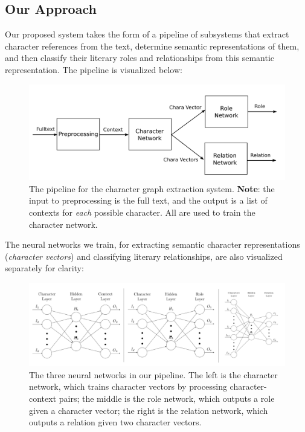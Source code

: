 \documentclass[12pt]{article}
\begin{document}
\subsection{Our Approach}
    Our proposed system takes the form of a pipeline of subsystems that extract character references from the text, determine semantic representations of them, and then classify their literary roles and relationships from this semantic representation. The pipeline is visualized below: 
    
    \begin{figure}[H]
        \centering
        \includegraphics[width=6in]{pipeline.png}
        \caption{The pipeline for the character graph extraction system. \textbf{Note}: the input to preprocessing is the full text, and the output is a list of contexts for \emph{each} possible character. All are used to train the character network.} 
    \end{figure}

    The neural networks we train, for extracting semantic character representations (\emph{character vectors}) and classifying literary relationships, are also visualized separately for clarity: \\

    \begin{figure}[H]
        \centering
        \includegraphics[width=7in]{networks.png}
        \caption{The three neural networks in our pipeline. The left is the character network, which trains character vectors by processing character-context pairs; the middle is the role network, which outputs a role given a character vector; the right is the relation network, which outputs a relation given two character vectors.}
    \end{figure}
    
\end{document}
